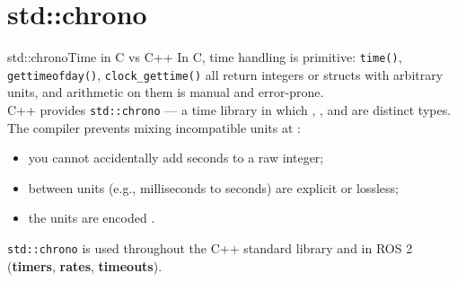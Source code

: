 
\section{std::chrono}
\graphicspath{{figs/section1/}}

\begin{frame}{std::chrono}{Time in C vs C++}
	\justifying
	In C, time handling is primitive: \texttt{time()}, \texttt{gettimeofday()}, \texttt{clock\_gettime()} all return integers or structs with arbitrary units, and arithmetic on them is manual and error-prone.\\
	\bigskip
	C++ provides \texttt{std::chrono} — a  time library in which , , and  are distinct types.\\
	The compiler prevents mixing incompatible units at :
	\begin{itemize}
		\item you cannot accidentally add seconds to a raw integer;
		\item {} between units (e.g., milliseconds to seconds) are explicit or lossless;
		\item the units are encoded .
	\end{itemize}
	\bigskip
	\begin{block}{}
		\centering
		\texttt{std::chrono} is used throughout the C++ standard library and in ROS 2\\
    (\textbf{timers}, \textbf{rates}, \textbf{timeouts}).
	\end{block}
\end{frame}

